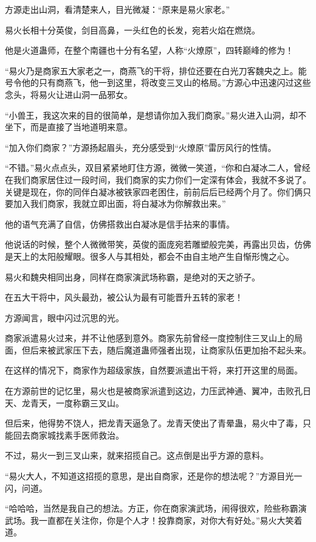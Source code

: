 \begin{this_body}
方源走出山洞，看清楚来人，目光微凝：“原来是易火家老。”

易火长相十分英俊，剑目高鼻，一头红色的长发，宛若火焰在燃烧。

他是火道蛊师，在整个南疆也十分有名望，人称“火燎原”，四转巅峰的修为！

“易火乃是商家五大家老之一，商燕飞的干将，排位还要在白光刀客魏央之上。能号令他的只有商燕飞，他一到这里，将改变三叉山的格局。”方源心中迅速闪过这些念头，将易火让进山洞一品邪女。

“小兽王，我这次来的目的很简单，是想请你加入我们商家。”易火进入山洞，却不坐下，而是直接了当地道明来意。

“加入你们商家？”方源扬起眉头，充分感受到“火燎原”雷厉风行的性情。

“不错。”易火点点头，双目紧紧地盯住方源，微微一笑道，“你和白凝冰二人，曾经在我们商家居住过一段时间，我们商家的实力你们一定深有体会，我就不多说了。关键是现在，你的同伴白凝冰被铁家四老困住，前前后后已经两个月了。你们俩只要加入我们商家，我就立即出面，将白凝冰为你解救出来。”

他的语气充满了自信，仿佛搭救出白凝冰是信手拈来的事情。

他说话的时候，整个人微微带笑，英俊的面庞宛若雕塑般完美，再露出贝齿，仿佛是天上的太阳般耀眼。很多人与其相处，都会不由自主地产生自惭形愧之心。

易火和魏央相同出身，同样在商家演武场称霸，是绝对的天之骄子。

在五大干将中，风头最劲，被公认为最有可能晋升五转的家老！

方源闻言，眼中闪过沉思的光。

商家派遣易火过来，并不让他感到意外。商家先前曾经一度控制住三叉山上的局面，但后来被武家压下去，随后魔道蛊师强者出现，让商家队伍更加抬不起头来。

在这样的情况下，商家作为超级家族，自然要派遣出干将，来打开这里的局面。

在方源前世的记忆里，易火也是被商家派遣到这边，力压武神通、翼冲，击败孔日天、龙青天，一度称霸三叉山。

但后来，他得势不饶人，把龙青天逼急了。龙青天使出了青晕蛊，易火中了毒，只能回去商家城找素手医师救治。

不过，易火一到三叉山来，就来招揽自己。这点倒是出乎方源的意料。

“易火大人，不知道这招揽的意思，是出自商家，还是你的想法呢？”方源目光一闪，问道。

“哈哈哈，当然是我自己的想法。方正，你在商家演武场，闹得很欢，险些称霸演武场。我一直都在关注你，你是个人才！投靠商家，对你大有好处。”易火大笑着道。


\end{this_body}
